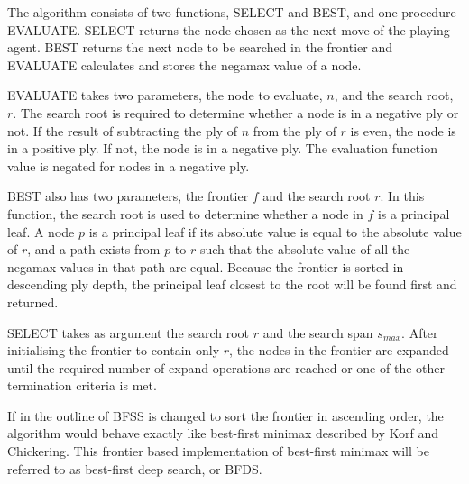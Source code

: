 The algorithm consists of two functions, SELECT and BEST, and one procedure EVALUATE.  SELECT returns the node chosen as the next move of the playing agent. BEST returns the next node to be searched in the frontier and EVALUATE calculates and stores the negamax value of a node.  

EVALUATE takes two parameters, the node to evaluate, $n$, and the search root, $r$.  The search root is required to determine whether a node is in a negative ply or not. If the result of subtracting the ply of  $n$  from the ply of $r$ is even, the node is in a positive ply.  If not, the node is in a negative ply.  The evaluation function value is negated for nodes in a negative ply.

BEST also has two parameters, the frontier $f$ and the search root $r$.  In this function, the search root is used to determine whether a node in $f$ is a principal leaf.  A node $p$ is a principal leaf if its absolute value is equal to the absolute value of $r$, and a path exists from $p$ to $r$ such that the absolute value of all the negamax values in that path are equal.  Because the frontier is sorted in descending ply depth, the principal leaf closest to the root will be found first and returned.  

SELECT takes as argument the search root $r$ and the search span $s_{max}$.  After initialising the frontier to contain only $r$, the nodes in the frontier are expanded until the required number of expand operations are reached or one of the other termination criteria is met.

If  in the outline of BFSS is changed to sort the frontier in ascending order, the algorithm would behave exactly like best-first minimax described by Korf and Chickering.  This frontier based implementation of best-first minimax will be referred to as best-first deep search, or BFDS.     
 


